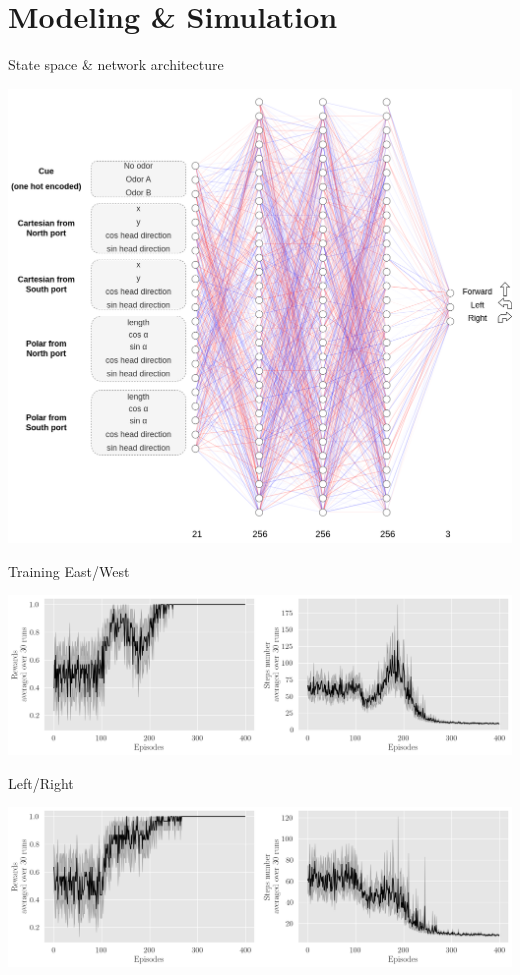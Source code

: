 \documentclass[bigger]{beamer}
\begin{document}
\section{Modeling \& Simulation}
\label{sec:orgbc9a86c}
\begin{frame}[label={sec:org89a78da}]{State space \& network architecture}
\begin{center}
\includegraphics[height=0.95\textheight]{medias/NN-architecture-MLP.drawio.png}
\end{center}
\end{frame}
\begin{frame}[label={sec:orgc9c9fa1}]{Training}
East/West
\begin{center}
\includegraphics[height=0.35\textheight]{medias/EastWest/training.png}
\end{center}
Left/Right
\begin{center}
\includegraphics[height=0.35\textheight]{medias/LeftRight/training.png}
\end{center}
\end{frame}
\end{document}
